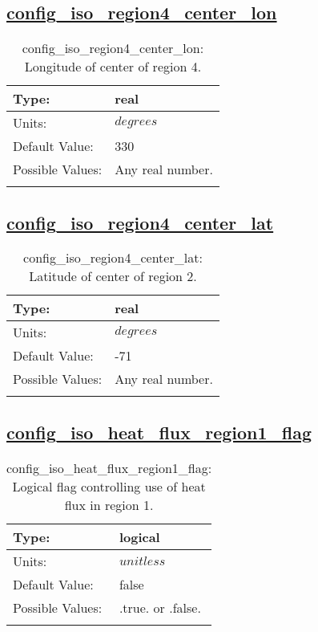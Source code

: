 \subsection[config\_iso\_region4\_center\_lon]{\hyperref[sec:nm_tab_iso]{config\_iso\_region4\_center\_lon}}
\label{subsec:nm_sec_config_iso_region4_center_lon}
\begin{center}
\begin{longtable}{| p{2.0in} || p{4.0in} |}
    \hline
    Type: & real \\
    \hline
    Units: & $degrees$ \\
    \hline
    Default Value: & 330 \\
    \hline
    Possible Values: & Any real number. \\
    \hline
    \caption{config\_iso\_region4\_center\_lon: Longitude of center of region 4.}
\end{longtable}
\end{center}
\subsection[config\_iso\_region4\_center\_lat]{\hyperref[sec:nm_tab_iso]{config\_iso\_region4\_center\_lat}}
\label{subsec:nm_sec_config_iso_region4_center_lat}
\begin{center}
\begin{longtable}{| p{2.0in} || p{4.0in} |}
    \hline
    Type: & real \\
    \hline
    Units: & $degrees$ \\
    \hline
    Default Value: & -71 \\
    \hline
    Possible Values: & Any real number. \\
    \hline
    \caption{config\_iso\_region4\_center\_lat: Latitude of center of region 2.}
\end{longtable}
\end{center}
\subsection[config\_iso\_heat\_flux\_region1\_flag]{\hyperref[sec:nm_tab_iso]{config\_iso\_heat\_flux\_region1\_flag}}
\label{subsec:nm_sec_config_iso_heat_flux_region1_flag}
\begin{center}
\begin{longtable}{| p{2.0in} || p{4.0in} |}
    \hline
    Type: & logical \\
    \hline
    Units: & $unitless$ \\
    \hline
    Default Value: & false \\
    \hline
    Possible Values: & .true. or .false. \\
    \hline
    \caption{config\_iso\_heat\_flux\_region1\_flag: Logical flag controlling use of heat flux in region 1.}
\end{longtable}
\end{center}
